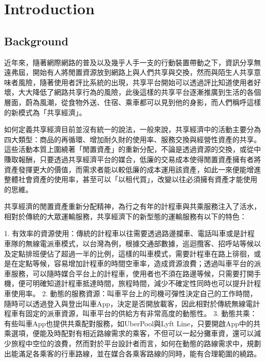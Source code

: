 
\chapter{Introduction}

\section{Background}

近年來，隨著網際網路的普及以及幾乎人手一支的行動裝置帶動之下，資訊分享無遠弗屆，開始有人將閒置資源放到網路上與人們共享與交換，然而與陌生人共享意味者風險，隨著使用者評比系統的出現，共享平台開始可以透過評比知道使用者好壞，大大降低了網路共享行為的風險\cite{schor_debating_2014}，此後這樣的共享平台逐漸推廣到生活的各個層面，蔚為風潮，從食物外送、住宿、乘車都可以見到他的身影，而人們稱呼這樣的新模式為「共享經濟」。

如何定義共享經濟目前並沒有統一的說法，一般來說，共享經濟中的活動主要分為四大類型：商品的再循環、增加耐久財的使用率、服務交換與經營性資產的共享\cite{schor_debating_2014}。這些活動本質上圍繞著「閒置資產」的重新分配\cite{frenken_smarter_2015}，不論是透過資源的交換，或從中賺取報酬，只要透過共享經濟平台的媒合，低廉的交易成本使得閒置資產擁有者將資產發揮更大的價值，而需求者能以較低廉的成本運用該資產，如此一來便能增進整體社會資產的使用率，甚至可以「以租代買」，改變以往必須擁有資產才能使用的思維。

共享經濟的閒置資產重新分配精神，為行之有年的計程車與共乘服務注入了活水，相對於傳統的大眾運輸服務，共享經濟下的新型態的運輸服務有以下的特色：
  
1. 有效率的資源使用：傳統的計程車以往需要透過路邊攔車、電話叫車或是計程車隊的無線電派車模式，以台灣為例，根據交通部數據，巡迴攬客、招呼站等候以及定點排班\cite{taxi_statistics_2012}便佔了超過一半的比例，這樣的叫車模式，需要計程車在路上徘徊，或是在定點等候，容易增加計程車的時間空車率，造成資源浪費；透過叫車平台的派車服務，可以隨時媒合平台上的計程車，使用者也不須在路邊等候，只需要打開手機，便可明確知道計程車抵達時間，旅程時間，減少不確定性同時也可以提升計程車使用率。
2. 動態的服務資源：叫車平台上的司機可彈性決定自己的工作時間，隨時可以透過登入與登出叫車App，決定是否開放載客，因此相對於傳統無線電計程車有固定的派車資源，叫車平台的供給方有非常高度的動態性。
3. 動態共乘：有些叫車App也提供共乘配對服務，如UberPool與Lyft Line，只要開啟App中的共乘選項，便能及時配對有相近路線需求的乘客，不但可以一起分攤車資，還可以減少旅程中空位的浪費，然而對於平台設計者而言，如何在動態的路線需求中，規劃出能滿足各乘客的行車路線，並在媒合各乘客路線的同時，能有合理範圍的繞路。


